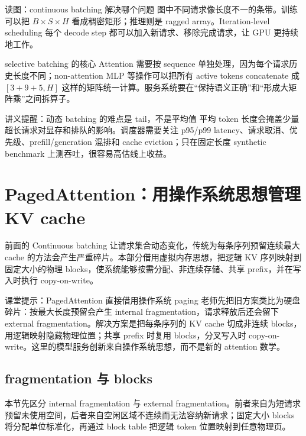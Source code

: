 \documentclass[a4paper]{article}
\begin{document}
\begin{knowledgebox}{读图：continuous batching 解决哪个问题}
图中不同请求像长度不一的条带。训练可以把 \(B\times S\times H\) 看成稠密矩形；推理则是 ragged array。Iteration-level scheduling 每个 decode step 都可以加入新请求、移除完成请求，让 GPU 更持续地工作。
\end{knowledgebox}

\begin{importantbox}{selective batching 的核心}
Attention 需要按 sequence 单独处理，因为每个请求历史长度不同；non-attention MLP 等操作可以把所有 active tokens concatenate 成 \([3+9+5,H]\) 这样的矩阵统一计算。服务系统要在“保持语义正确”和“形成大矩阵乘”之间拆算子。
\end{importantbox}

\begin{knowledgebox}{讲义提醒：动态 batching 的难点是 tail，不是平均值}
平均 token 长度会掩盖少量超长请求对显存和排队的影响。调度器需要关注 p95/p99 latency、请求取消、优先级、prefill/generation 混排和 cache eviction；只在固定长度 synthetic benchmark 上测吞吐，很容易高估线上收益。
\end{knowledgebox}

\section{PagedAttention：用操作系统思想管理 KV cache}

前面的 Continuous batching 让请求集合动态变化，传统为每条序列预留连续最大 cache 的方法会产生严重碎片。本部分借用虚拟内存思想，把逻辑 KV 序列映射到固定大小的物理 blocks，使系统能够按需分配、非连续存储、共享 prefix，并在写入时执行 copy-on-write。

\begin{knowledgebox}{课堂提示：PagedAttention 直接借用操作系统 paging}
老师先把旧方案类比为硬盘碎片：按最大长度预留会产生 internal fragmentation，请求释放后还会留下 external fragmentation。解决方案是把每条序列的 KV cache 切成非连续 blocks，用逻辑映射隐藏物理位置；共享 prefix 时复用 blocks，分叉写入时 copy-on-write。这里的模型服务创新来自操作系统思想，而不是新的 attention 数学。
\end{knowledgebox}

\subsection{fragmentation 与 blocks}

本节先区分 internal fragmentation 与 external fragmentation。前者来自为短请求预留未使用空间，后者来自空闲区域不连续而无法容纳新请求；固定大小 blocks 将分配单位标准化，再通过 block table 把逻辑 token 位置映射到任意物理页。
\end{document}
